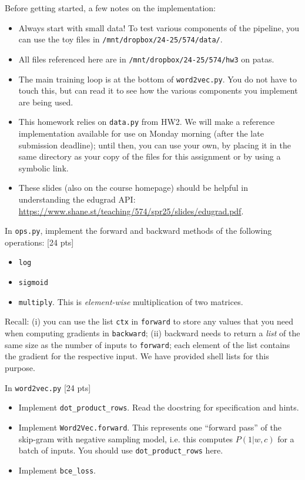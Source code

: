 \documentclass[11pt]{article}
\begin{document}
Before getting started, a few notes on the implementation:
\begin{itemize}
  \item Always start with small data!  To test various components of the pipeline, you can use the toy files in \texttt{/mnt/dropbox/24-25/574/data/}.
  \item All files referenced here are in \texttt{/mnt/dropbox/24-25/574/hw3} on patas.
  \item The main training loop is at the bottom of \texttt{word2vec.py}.  You do not have to touch this, but can read it to see how the various components you implement are being used.
  \item This homework relies on \texttt{data.py} from HW2. We will make a reference implementation available for use on Monday morning (after the late submission deadline); until then, you can use your own, by placing it in the same directory as your copy of the files for this assignment or by using a symbolic link.
  \item These slides (also on the course homepage) should be helpful in understanding the edugrad API: \url{https://www.shane.st/teaching/574/spr25/slides/edugrad.pdf}.  
\end{itemize}

\vspace{2em}
 In \texttt{ops.py}, implement the forward and backward methods of the following operations: [24 pts]
\begin{itemize}
  \item \texttt{log}
  \item \texttt{sigmoid}
  \item \texttt{multiply}.  This is \emph{element-wise} multiplication of two matrices.
\end{itemize}
Recall: (i) you can use the list \texttt{ctx} in \texttt{forward} to store any values that you need when computing gradients in \texttt{backward}; (ii) backward needs to return a \emph{list} of the same size as the number of inputs to \texttt{forward}; each element of the list contains the gradient for the respective input.  We have provided shell lists for this purpose.

\vspace{2em}
 In \texttt{word2vec.py} [24 pts]
\begin{itemize}
  \item Implement \texttt{dot\_product\_rows}.  Read the docstring for specification and hints.
  \item Implement \texttt{Word2Vec.forward}.  This represents one ``forward pass'' of the skip-gram with negative sampling model, i.e. this computes $P(1 | w, c)$ for a batch of inputs.  You should use \texttt{dot\_product\_rows} here.
  \item Implement \texttt{bce\_loss}.
\end{itemize}
\end{document}
